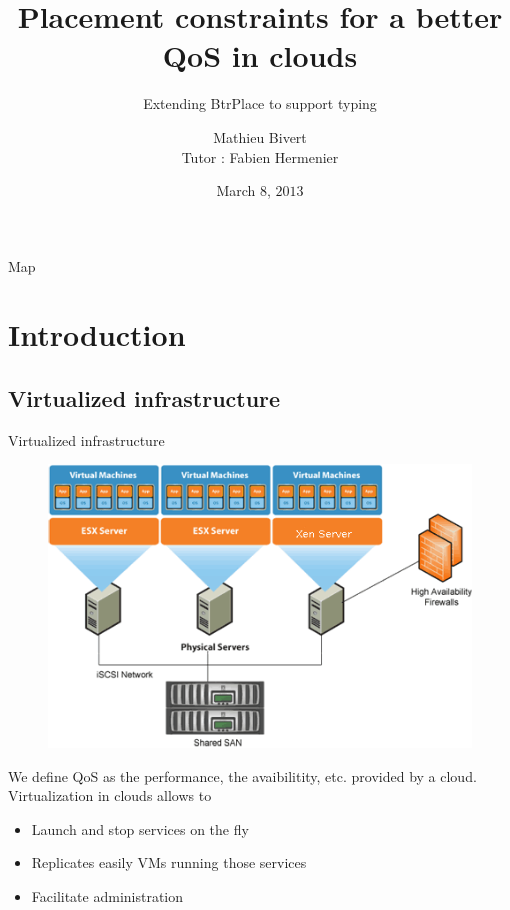 \documentclass{beamer}
\title{Placement constraints for a better QoS in clouds}
\subtitle{Extending BtrPlace to support typing}
\author[]{Mathieu Bivert\\Tutor : Fabien Hermenier}
\institute{Polytech'Nice Sophia}
\date{March $8$, $2013$}
\begin{document}
\begin{frame}{}
\titlepage
\end{frame}

\begin{frame}{Map}
\tableofcontents
\end{frame}

\section{Introduction}
\subsection{Virtualized infrastructure}
\begin{frame}{Virtualized infrastructure}
\begin{figure}[!ht]
	\centering
	\includegraphics[scale=.4]{imgs/samplecloud.png}
\end{figure}

We define QoS as the performance, the avaibilitity, etc. provided by
a cloud.
Virtualization in clouds allows to
\begin{itemize}
	\item Launch and stop services on the fly
	\item Replicates easily VMs running those services
	\item Facilitate administration
\end{itemize}
\end{frame}
\end{document}
